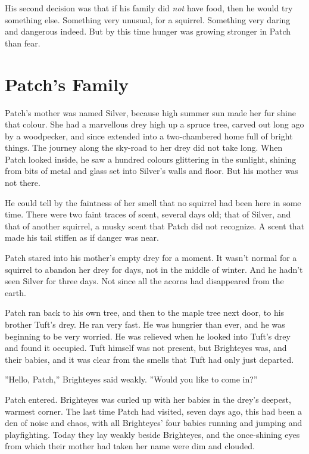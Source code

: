 \documentclass[12pt]{book}
\begin{document}
His second decision was that if his family did {\it not} have food, then %
he would try something else. Something very unusual, for a squirrel. Something very daring and dangerous indeed. But by this time hunger was growing stronger in Patch than fear.


\section{Patch's Family}

Patch's mother was named Silver, because high summer sun made her fur shine that colour. She had a marvellous drey high up a spruce tree, carved out long ago by a woodpecker, and since extended into a two-chambered home full of bright things. The journey along the sky-road to her drey did not take long. When Patch looked inside, he saw a hundred colours glittering in the sunlight, shining from bits of metal and glass set into Silver's walls and floor. But his mother was not there.

He could tell by the faintness of her smell that no squirrel had been here in some time. There were two faint traces of scent, several days old; that of Silver, and that of another squirrel, a musky scent that Patch did not recognize. A scent that made his tail stiffen as if danger was near.

Patch stared into his mother's empty drey for a moment. It wasn't normal for a squirrel to abandon her drey for days, not in the middle of winter. And he hadn't seen Silver for three days. Not since all the acorns had disappeared from the earth.

Patch ran back to his own tree, and then to the maple tree next door, to his brother Tuft's drey. He ran very fast. He was hungrier than ever, and he was beginning to be very worried. He was relieved when he looked into Tuft's drey and found it occupied. Tuft himself was not present, but Brighteyes was, and their babies, and it was clear from the smells that Tuft had only just departed.

''Hello, Patch,'' Brighteyes said weakly. ''Would you like to come in?''

Patch entered. Brighteyes was curled up with her babies in the drey's deepest, warmest corner. The last time Patch had visited, seven days ago, this had been a den of noise and chaos, with all Brighteyes' four babies running and jumping and playfighting. Today they lay weakly beside Brighteyes, and the once-shining eyes from which their mother had taken her name were dim and clouded.
\end{document}
